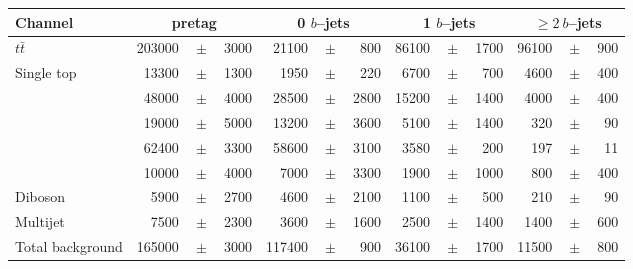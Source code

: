 \begin{table}
  \begin{tabular}{ l  rrr  rrr  rrr  rrr }
    \toprule
    Channel & \multicolumn{3}{c}{\mujets{} pretag} &
    \multicolumn{3}{c}{\mujets{} 0 $b$--jets} &
    \multicolumn{3}{c}{\mujets{} 1 $b$--jets} &
    \multicolumn{3}{c}{\mujets{} $\geq2~b$--jets} \\
    \midrule      
    $t\bar{t}$                  & 203000 &$\!\!\!\pm\!\!\!$& 3000   & 21100 &$\!\!\!\pm\!\!\!$& 800   & 86100 &$\!\!\!\pm\!\!\!$& 1700 & 96100 &$\!\!\!\pm\!\!\!$& 900  \\
    Single top                  & 13300  &$\!\!\!\pm\!\!\!$& 1300   & 1950 &$\!\!\!\pm\!\!\!$& 220    & 6700 &$\!\!\!\pm\!\!\!$& 700   & 4600 &$\!\!\!\pm\!\!\!$& 400   \\
    \wbb{}                      & 48000  &$\!\!\!\pm\!\!\!$& 4000   & 28500 &$\!\!\!\pm\!\!\!$& 2800  & 15200 &$\!\!\!\pm\!\!\!$& 1400 & 4000 &$\!\!\!\pm\!\!\!$& 400   \\
    \wc{}                       & 19000  &$\!\!\!\pm\!\!\!$& 5000   & 13200 &$\!\!\!\pm\!\!\!$& 3600  & 5100 &$\!\!\!\pm\!\!\!$& 1400  & 320 &$\!\!\!\pm\!\!\!$& 90\\
    \wlight{}                   & 62400  &$\!\!\!\pm\!\!\!$& 3300   & 58600 &$\!\!\!\pm\!\!\!$& 3100  & 3580 &$\!\!\!\pm\!\!\!$& 200   & 197 &$\!\!\!\pm\!\!\!$& 11  \\   
    \zjets{}                    & 10000  &$\!\!\!\pm\!\!\!$& 4000   & 7000 &$\!\!\!\pm\!\!\!$& 3300   & 1900 &$\!\!\!\pm\!\!\!$& 1000  & 800 &$\!\!\!\pm\!\!\!$& 400\\
    Diboson                     & 5900   &$\!\!\!\pm\!\!\!$& 2700   & 4600 &$\!\!\!\pm\!\!\!$& 2100   & 1100 &$\!\!\!\pm\!\!\!$& 500   & 210 &$\!\!\!\pm\!\!\!$& 90   \\  
    Multijet                    & 7500   &$\!\!\!\pm\!\!\!$& 2300   & 3600 &$\!\!\!\pm\!\!\!$& 1600   & 2500 &$\!\!\!\pm\!\!\!$& 1400  & 1400 &$\!\!\!\pm\!\!\!$& 600   \\
    \midrule                                                                                                                                                            
    Total background            & 165000 &$\!\!\!\pm\!\!\!$& 3000   & 117400 &$\!\!\!\pm\!\!\!$& 900  & 36100 &$\!\!\!\pm\!\!\!$& 1700 & 11500 &$\!\!\!\pm\!\!\!$& 800\\
    \midrule                                                                                                                                                            

\end{tabular}
\end{table}
